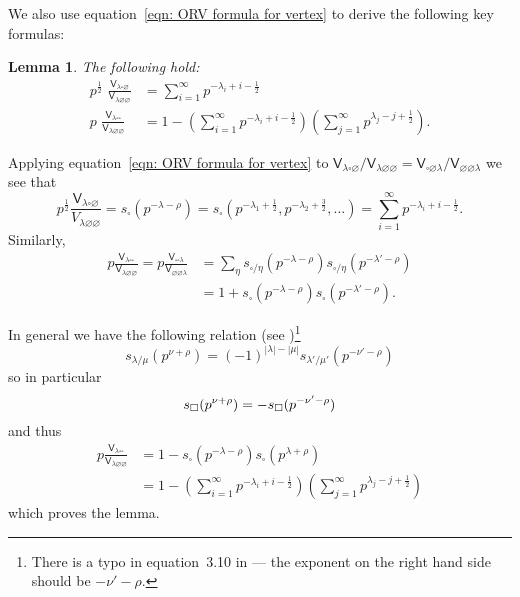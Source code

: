 \documentclass[12pt]{amsart}
\newcommand{\Vsf}{\mathsf{V}}
\newcommand{\bx}{\square}
\renewcommand{\emptyset}{\varnothing}
\newcommand{\half}{\frac{1}{2}}
\newtheorem{lemma}[theorem]{Lemma}
\theoremstyle{definition}
\begin{document}
We also use equation~\eqref{eqn: ORV formula for vertex} to derive the
following key formulas:
\begin{lemma}\label{lem: eqns for Vlambdaboxempty/Vlambdaemptyempty
and Vlambdaboxbox/Vlambdaemptyempty} 
The following hold:
\begin{align*}
p^{\half }\,\,  \frac{\Vsf_{\lambda \bx \emptyset}}{\Vsf_{\lambda
\emptyset \emptyset}} &= \sum_{i=1}^{\infty} p^{-\lambda_{i}+i-\half }\\
p\,\,  \frac{\Vsf_{\lambda \bx \bx}}{\Vsf_{\lambda
\emptyset \emptyset}} &= 1-\left(\sum_{i=1}^{\infty}
p^{-\lambda_{i}+i-\half } \right) \left(\sum_{j=1}^{\infty} p^{\lambda_{j}-j+\half } \right).
\end{align*}
\end{lemma}
\proof Applying equation~\eqref{eqn: ORV formula for vertex} to
$\Vsf_{\lambda \bx \emptyset}/\Vsf_{\lambda \emptyset
\emptyset}=\Vsf_{\bx \emptyset \lambda}/\Vsf_{\emptyset \emptyset
\lambda}$ we see that
\[
p^{\half} \frac{\Vsf_{\lambda \bx \emptyset}}{V_{\lambda \emptyset
\emptyset  }} = s_{\bx}(p^{-\lambda -\rho})=s_{\bx}
(p^{-\lambda_{1}+\half },p^{-\lambda_{2}+\frac{3}{2}},\dots ) =
\sum_{i=1}^{\infty} p^{-\lambda_{i}+i-\half }.
\]
Similarly, 
\begin{align*}
p\frac{\Vsf_{\lambda \bx \bx}}{\Vsf_{\lambda \emptyset \emptyset}} =
p\frac{\Vsf_{\bx \bx \lambda}}{\Vsf_{\emptyset \emptyset \lambda }} &=
\sum_{\eta} s_{\bx /\eta}(p^{-\lambda -\rho} )  s_{\bx /\eta}(p^{-\lambda' -\rho} )  \\
&= 1 + s_{\bx}(p^{-\lambda -\rho })s_{\bx}(p^{-\lambda' -\rho }).
\end{align*}

In general we have the following relation (see
\cite[Eqn~(3.10)]{Ok-Re-Va})\footnote{There is a typo in equation~3.10 in
\cite{Ok-Re-Va} --- the exponent on the right hand side should be $-\nu'-\rho$. }
\[
s_{\lambda /\mu}(p^{\nu +\rho}) = (-1)^{|\lambda |-|\mu |}s_{\lambda
'/\mu '}(p^{-\nu '-\rho})
\]
so in particular 
\begin{equation}\label{eqn: s(p^{nu+rho})=-s(p^{-nu'-rho})}
s_{\bx}(p^{\nu +\rho})=-s_{\bx}(p^{-\nu '-\rho})
\end{equation}
and thus
\begin{align*}
p\frac{\Vsf_{\lambda \bx \bx}}{\Vsf_{\lambda \emptyset \emptyset}} &=
1 - s_{\bx}(p^{-\lambda -\rho })s_{\bx}(p^{\lambda +\rho })\\
&= 1-\left(\sum_{i=1}^{\infty} p^{-\lambda_{i}+i-\half }
\right)\left(\sum_{j=1}^{\infty} p^{\lambda_{j}-j+\half } \right)
\end{align*}
which proves the lemma.
\end{document}
